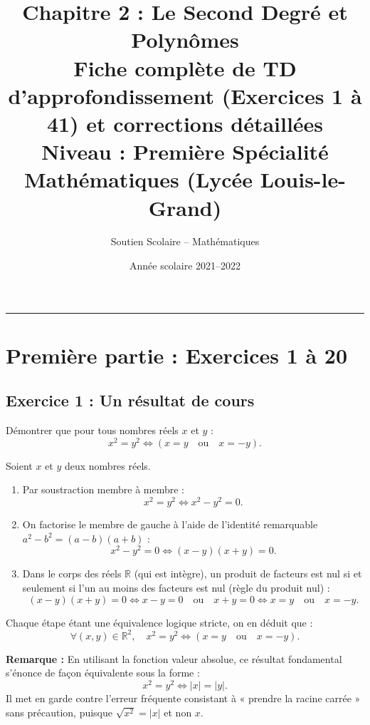 \documentclass[11pt,a4paper]{article}
\title{\textbf{Chapitre 2 : Le Second Degré et Polynômes}\\\large Fiche complète de TD d'approfondissement (Exercices 1 à 41) et corrections détaillées\\{\small Niveau : Première Spécialité Mathématiques (Lycée Louis-le-Grand)}}
\author{Soutien Scolaire -- Mathématiques}
\date{Année scolaire 2021--2022}
\newcommand{\R}{\mathbb{R}}
\begin{document}
\maketitle

\tableofcontents
\vspace{1cm}
\hrule
\vspace{1cm}

\section*{Première partie : Exercices 1 à 20}

\subsection*{Exercice 1 : Un résultat de cours}
Démontrer que pour tous nombres réels $x$ et $y$ :
\[
x^2 = y^2 \iff (x = y \quad \text{ou} \quad x = -y).
\]

\begin{correctionbox}
Soient $x$ et $y$ deux nombres réels.
\begin{enumerate}
    \item Par soustraction membre à membre :
    \[
    x^2 = y^2 \iff x^2 - y^2 = 0.
    \]
    \item On factorise le membre de gauche à l'aide de l'identité remarquable $a^2 - b^2 = (a-b)(a+b)$ :
    \[
    x^2 - y^2 = 0 \iff (x - y)(x + y) = 0.
    \]
    \item Dans le corps des réels $\R$ (qui est intègre), un produit de facteurs est nul si et seulement si l'un au moins des facteurs est nul (règle du produit nul) :
    \[
    (x - y)(x + y) = 0 \iff x - y = 0 \quad \text{ou} \quad x + y = 0 \iff x = y \quad \text{ou} \quad x = -y.
    \]
\end{enumerate}
Chaque étape étant une équivalence logique stricte, on en déduit que :
\[
\forall (x, y) \in \R^2, \quad x^2 = y^2 \iff (x = y \quad \text{ou} \quad x = -y).
\]

\textbf{Remarque :} En utilisant la fonction valeur absolue, ce résultat fondamental s'énonce de façon équivalente sous la forme :
\[
x^2 = y^2 \iff |x| = |y|.
\]
Il met en garde contre l'erreur fréquente consistant à « prendre la racine carrée » sans précaution, puisque $\sqrt{x^2} = |x|$ et non $x$.
\end{correctionbox}
\end{document}
